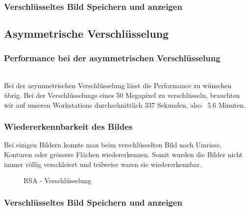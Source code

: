\documentclass[paper=a4,fontsize=12pt]{scrartcl}
\begin{document}
\subsubsection{Verschlüsseltes Bild Speichern und anzeigen}

\subsection{Asymmetrische Verschlüsselung}
\subsubsection{Performance bei der asymmetrischen Verschlüsselung}
 \\
Bei der asymmetrischen Verschlüsselung lässt die Performance zu wünschen übrig.
Bei der Verschlüsselungs eines 50 Megapixel zu verschlüsseln, brauchten wir auf unseren
Workstations durchschnittlich 337 Sekunden, also ~5.6 Minuten.
\subsubsection{Wiedererkennbarkeit des Bildes}
 Bei einigen Bildern konnte man beim verschlüsselten Bild noch Umrisse, Konturen oder grössere
 Flächen wiedererkennen.
 Somit wurden die Bilder nicht immer völlig verschleiert und teilweise waren sie wiedererkennbar.
 \begin{figure}[H] 
	\centering
	\caption[RSA - Verschlüsselung]{RSA - Verschlüsselung}  
	\label{asym-enc-result} 
\end{figure}

\subsubsection{Verschlüsseltes Bild Speichern und anzeigen}
\end{document}
